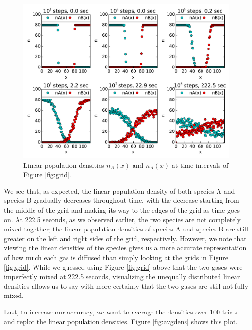 \documentclass{article}
\begin{document}
\begin{figure}[H]
\centering
\includegraphics[width=12cm]{GP1_3b_2.pdf}
\caption{Linear population densities $n_{A}(x)$ and $n_{B}(x)$ at time intervals of Figure \ref{fig:grid}.}
\label{fig:dens}
\end{figure}

\noindent We see that, as expected, the linear population density of both species A and species B gradually decreases throughout time, with the decrease starting from the middle of the grid and making its way to the edges of the grid as time goes on. At 222.5 seconds, as we observed earlier, the two species are not completely mixed together; the linear population densities of species A and species B are still greater on the left and right sides of the grid, respectively. However, we note that viewing the linear densities of the species gives us a more accurate representation of how much each gas is diffused than simply looking at the grids in Figure \ref{fig:grid}. While we guessed using Figure \ref{fig:grid} above that the two gases were imperfectly mixed at 222.5 seconds, visualizing the unequally distributed linear densities allows us to say with more certainty that the two gases are still not fully mixed.\par
Last, to increase our accuracy, we want to average the densities over 100 trials and replot the linear population densities. Figure \ref{fig:avgdens} shows this plot.\par
\end{document}
